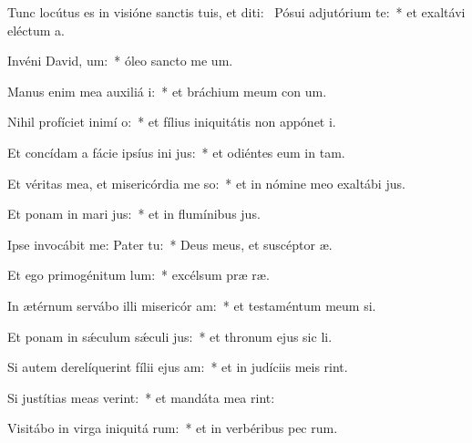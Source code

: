 \item Tunc locútus es in visióne sanctis tuis, et diti:~\pscross{} Pósui adjutórium  te:~* et exaltávi eléctum   a.
\item Invéni David,  um:~* óleo sancto me  um.
\item Manus enim mea auxiliá i:~* et bráchium meum con um.
\item Nihil profíciet inimí  o:~* et fílius iniquitátis non appónet  i.
\item Et concídam a fácie ipsíus ini jus:~* et odiéntes eum in  tam.
\item Et véritas mea, et misericórdia me  so:~* et in nómine meo exaltábi  jus.
\item Et ponam in mari  jus:~* et in flumínibus  jus.
\item Ipse invocábit me: Pater   tu:~* Deus meus, et suscéptor  æ.
\item Et ego primogénitum  lum:~* excélsum præ  ræ.
\item In ætérnum servábo illi misericór am:~* et testaméntum meum  si.
\item Et ponam in sǽculum sǽculi  jus:~* et thronum ejus sic  li.
\item Si autem derelíquerint fílii ejus  am:~* et in judíciis meis  rint.
\item Si justítias meas verint:~* et mandáta mea  rint:
\item Visitábo in virga iniquitá rum:~* et in verbéribus pec rum.
